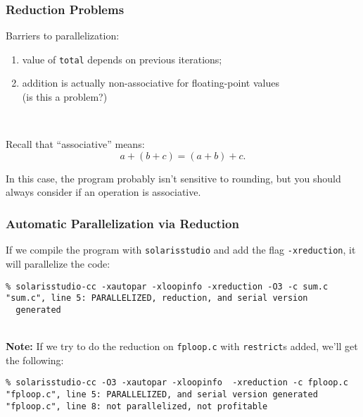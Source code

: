 \begin{frame}[fragile]
  \frametitle{Reduction Problems}


  Barriers to parallelization:
  \begin{enumerate}
    \item value of {\tt total} depends on previous
      iterations;
    \item addition is actually non-associative for floating-point values
      \\ (is this a problem?)
  \end{enumerate}
  ~\\[1em]
  \begin{center}
    Recall that ``associative'' means: 
     \[a + (b + c) = (a + b) + c.\]
  \end{center}
     In this case, the program probably isn't sensitive to rounding,
      but you should always consider if an operation is associative.

\end{frame}

\begin{frame}[fragile]
  \frametitle{Automatic Parallelization via Reduction}


  If we compile the program with {\tt solarisstudio} and add the flag
  {\tt -xreduction}, it will parallelize the code:


  \begin{lstlisting}
% solarisstudio-cc -xautopar -xloopinfo -xreduction -O3 -c sum.c 
"sum.c", line 5: PARALLELIZED, reduction, and serial version
  generated
  \end{lstlisting}
~\\[1em]


  {\bf Note:} If we try to do the reduction on {\tt fploop.c} with {\tt restrict}s added, we'll get the following:


  \begin{lstlisting}
% solarisstudio-cc -O3 -xautopar -xloopinfo  -xreduction -c fploop.c
"fploop.c", line 5: PARALLELIZED, and serial version generated
"fploop.c", line 8: not parallelized, not profitable
  \end{lstlisting}

\end{frame}

